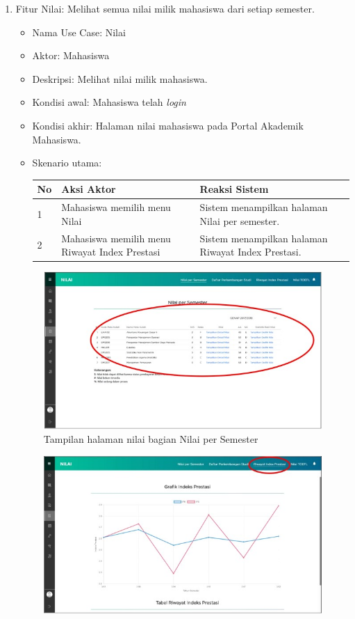\begin{enumerate}
	\item Fitur Nilai: Melihat semua nilai milik mahasiswa dari setiap semester.
	\begin{itemize}
		\item Nama Use Case: Nilai
		\item Aktor: Mahasiswa
		\item Deskripsi: Melihat nilai milik mahasiswa.
		\item Kondisi awal: Mahasiswa telah \textit{login}
		\item Kondisi akhir: Halaman nilai mahasiswa pada Portal Akademik Mahasiswa.
		\item Skenario utama:
		\begin{table}[h!]
			\centering
			\label{}
			\begin{tabular}{ | m{0.5cm} | m{7cm}| m{6cm} | } 
				\hline
				No & Aksi Aktor & Reaksi Sistem \\ 
				\hline
				1 & Mahasiswa memilih menu Nilai & Sistem menampilkan halaman Nilai per semester.
				\\ 
				\hline
				2 & Mahasiswa memilih menu Riwayat Index Prestasi & Sistem menampilkan halaman Riwayat Index Prestasi.
				\\ 
				\hline
			\end{tabular}
		\end{table}	
	\end{itemize}
	\begin{figure}[H]
		\centering
		\includegraphics[scale=0.7]{Gambar/nilai2018.jpg}
		\caption{Tampilan halaman nilai bagian Nilai per Semester} 
		\label{fig:nilai_2018}
	\end{figure}
	\begin{figure}[H]
		\centering
		\includegraphics[scale=0.7]{Gambar/rip2018.jpg}

\end{figure}
\end{enumerate}
